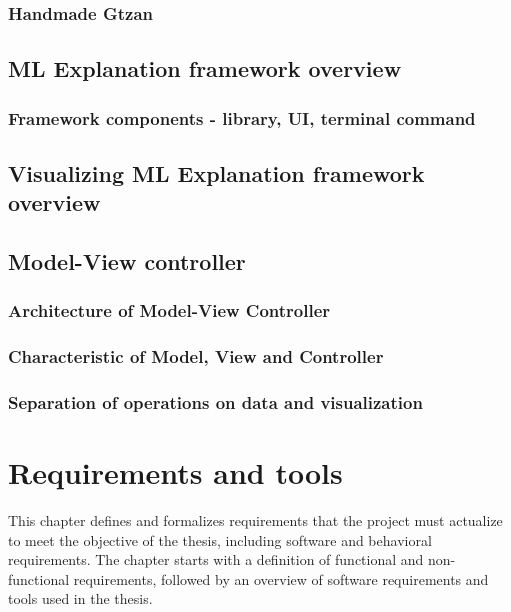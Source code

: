 \documentclass[
    bindingoffset=5mm,  %
    footnoteindent=3mm, %
    hyphenation=true    %
]{src/wut-thesis}
\begin{document}
\subsubsection{Handmade Gtzan}

\subsection{ML Explanation framework overview}
\subsubsection{Framework components - library, UI, terminal command}

\subsection{Visualizing ML Explanation framework overview}

\subsection{Model-View controller}
\subsubsection{Architecture of Model-View Controller}
\subsubsection{Characteristic of Model, View and Controller}
\subsubsection{Separation of operations on data and visualization}

%
%
\clearpage %
\section{Requirements and tools} \label{ch:reqrTools}

        This chapter defines and formalizes requirements that the project must actualize
    to meet the objective of the thesis, including software and behavioral requirements.
    The chapter starts with a definition of functional and non-functional requirements,
    followed by an overview of software requirements and tools used in the thesis.
\end{document}

